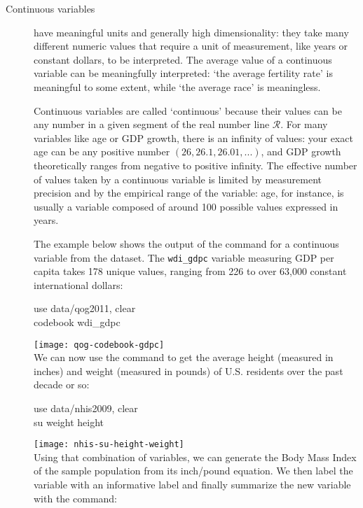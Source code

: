 \begin{description}
	\item[Continuous variables] have meaningful units and generally high dimensionality: they take many different numeric values that require a unit of measurement, like years or constant dollars, to be interpreted. The average value of a continuous variable can be meaningfully interpreted: `the average fertility rate' is meaningful to some extent, while `the average race' is meaningless.

	Continuous variables are called `continuous' because their values can be any number in a given segment of the real number line $\mathcal{R}$. For many variables like age or GDP growth, there is an infinity of values: your exact age can be any positive number $(26, 26.1, 26.01, ...)$, and GDP growth theoretically ranges from negative to positive infinity. The effective number of values taken by a continuous variable is limited by measurement precision and by the empirical range of the variable: age, for instance, is usually a variable composed of around 100 possible values expressed in years.

	The example below shows the output of the  command for a continuous variable from the \qog dataset. The \texttt{wdi\_gdpc} variable measuring GDP per capita takes 178 unique values, ranging from 226 to over 63,000 constant international dollars:\\[1em]
	
	\begin{docspec}
		use data/qog2011, clear\\
		codebook wdi\_gdpc
	\end{docspec}
	
	\texttt{[image: qog-codebook-gdpc]}\\[1em]
	
	We can now use the  command to get the average height (measured in inches) and weight (measured in pounds) of U.S. residents over the past decade or so:
	
	\begin{docspec}
		use data/nhis2009, clear\\
		su weight height
	\end{docspec}
		
	\texttt{[image: nhis-su-height-weight]}\\[1em]
	
	Using that combination of variables, we can generate the Body Mass Index of the sample population from its inch/pound equation. We then label the variable with an informative label and finally summarize the new variable with the  command:\\[1em]
	

\end{description}
